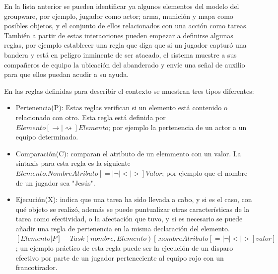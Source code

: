 En la lista anterior se pueden identificar ya algunos elementos del modelo del groupware, por ejemplo, jugador como actor; arma, munici\'on y mapa como posibles objetos, y el conjunto de ellos relacionados con una acci\'on como tareas. Tambi\'en a partir de estas interacciones pueden empezar a definirse algunas reglas, por ejemplo establecer una regla que diga que si un jugador captur\'o una bandera y est\'a en peligro inminente de ser atacado, el sistema muestre a sus compa\~neros de equipo la ubicaci\'on del abanderado y env\'ie una se\~nal de auxilio para que ellos puedan acudir a su ayuda.

En las reglas definidas para describir el contexto se muestran tres tipos diferentes:

\begin{itemize}
\item Pertenencia(P): Estas reglas verifican si un elemento est\'a contenido o relacionado con otro. Esta regla est\'a definida por $Elemento [ \rightarrow | \rightsquigarrow ] Elemento$; por ejemplo la pertenencia de un actor a un equipo determinado.
\item Comparaci\'on(C): comparan el atributo  de un elemmento con un valor. La sintaxis para esta regla es la siguiente $Elemento.NombreAtributo [ = | ¬ | < | > ] Valor$; por ejemplo que el nombre de un jugador sea "Jes\'us".
\item Ejecuci\'on(X): indica que una tarea ha sido llevada a cabo, y si es el caso, con qu\'e objeto se realiz\'o, adem\'as se puede puntualizar otras caracter\'isticas de la tarea como efectividad, o la afectaci\'on que tuvo, y si es necesario se puede a\~nadir una regla de pertenencia en la misma declaraci\'on del elemento.  $ [Elemento | P] - Task(nombre, Elemento) [ .nombreAtributo [ = | ¬ | < | > ] valor ]$; un ejemplo pr\'actico de esta regla puede ser la ejecuci\'on de un disparo efectivo por parte de un jugador perteneciente al equipo rojo con un francotirador.
\end{itemize}


